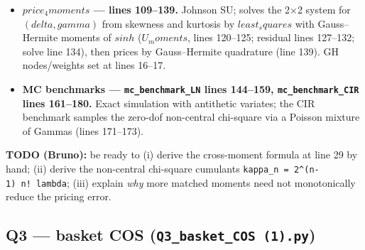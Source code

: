 \documentclass[
  11pt,
]{article}
\begin{document}
\begin{itemize}
  \((w+2)sqrt(w-1) = g1\) for \(w\) by \(brentq\) (line 99), recovers
  shift and shifted strike.
\item
  \textbf{\(price_4moments\) --- lines 109--139.} Johnson SU; solves the
  2×2 system for \((delta, gamma)\) from skewness and kurtosis by
  \(least_squares\) with Gauss--Hermite moments of \(sinh\)
  (\(U_moments\), lines 120--125; residual lines 127--132; solve line
  134), then prices by Gauss--Hermite quadrature (line 139). GH
  nodes/weights set at lines 16--17.
\item
  \textbf{MC benchmarks --- \texttt{mc\_benchmark\_LN} lines 144--159,
  \texttt{mc\_benchmark\_CIR} lines 161--180.} Exact simulation with
  antithetic variates; the CIR benchmark samples the zero-dof
  non-central chi-square via a Poisson mixture of Gammas (lines
  171--173).
\end{itemize}

\textbf{TODO (Bruno):} be ready to (i) derive the cross-moment formula
at line 29 by hand; (ii) derive the non-central chi-square cumulants
\texttt{kappa\_n\ =\ 2\^{}(n-1)\ n!\ lambda}; (iii) explain \emph{why}
more matched moments need not monotonically reduce the pricing error.

\hypertarget{q3-basket-cos-q3_basket_cos-1.py}{%
\subsection{\texorpdfstring{Q3 --- basket COS
(\texttt{Q3\_basket\_COS\ (1).py})}{Q3 --- basket COS (Q3\_basket\_COS (1).py)}}\label{q3-basket-cos-q3_basket_cos-1.py}}
\end{document}
